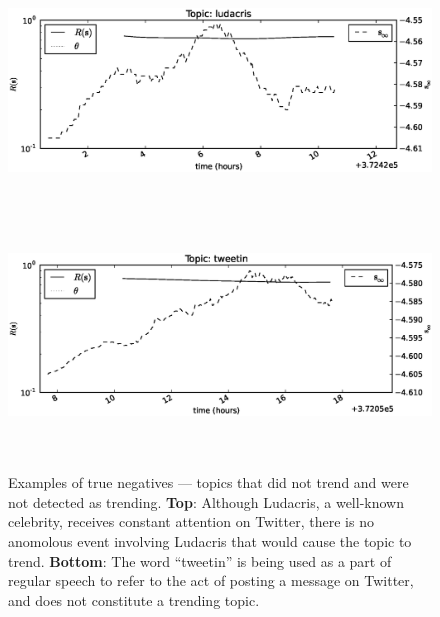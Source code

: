 \begin{figure}[!h]
\begin{center}
\includegraphics[height=2.5in]{../fig/final/detection_examples/tn/ludacris.eps}
\includegraphics[height=2.5in]{../fig/final/detection_examples/tn/tweetin.eps}
\end{center}
\caption{\label{fig:examples2} Examples of true negatives --- topics that did
  not trend and were not detected as trending. {\bf Top}: Although Ludacris, a
  well-known celebrity, receives constant attention on Twitter, there is no
  anomolous event involving Ludacris that would cause the topic to trend. {\bf
    Bottom}: The word ``tweetin'' is being used as a part of regular speech to
  refer to the act of posting a message on Twitter, and does not constitute a
  trending topic. }
\end{figure}

